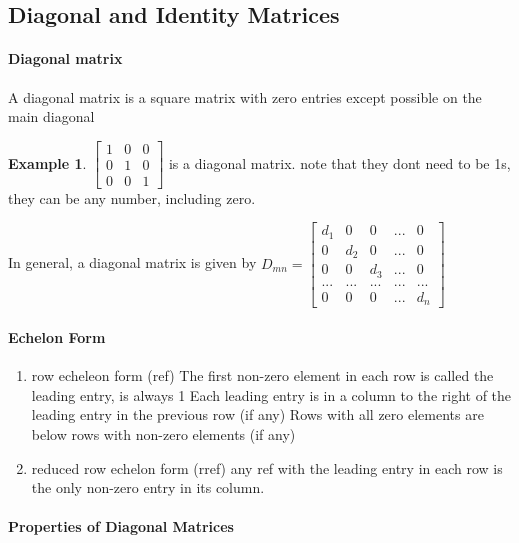 \documentclass{article}
\theoremstyle{definition}
\newtheorem{example}[theorem]{Example}
\theoremstyle{remark}
\begin{document}
\subsection{Diagonal and Identity Matrices}

\paragraph{Diagonal matrix}
A diagonal matrix is a square matrix with zero entries except possible on the main diagonal

\begin{example}
    $\begin{bmatrix}
        1 & 0 & 0 \\
        0 & 1 & 0 \\
        0 & 0 & 1
    \end{bmatrix}$ is a diagonal matrix. note that they dont need to be 1s, they can be any number, including zero. 
\end{example}

In general, a diagonal matrix is given by $D_{mn} = \begin{bmatrix}
    d_1 & 0 & 0 & ... & 0 \\
    0 & d_2 & 0 & ... & 0 \\
    0 & 0 & d_3 & ... & 0 \\
    ... & ... & ... & ... & ... \\
    0 & 0 & 0 & ... & d_n
\end{bmatrix}$

\paragraph{Echelon Form}

\begin{enumerate}
    \item row echeleon form (ref)
    \subitem The first non-zero element in each row is called the leading entry, is always 1
    \subitem Each leading entry is in a column to the right of the leading entry in the previous row (if any)
    \subitem Rows with all zero elements are below rows with non-zero elements (if any)
    \item reduced row echelon form (rref)
    \subitem any ref with the leading entry in each row is the only non-zero entry in its column. 
\end{enumerate}

\paragraph{Properties of Diagonal Matrices}
\end{document}
